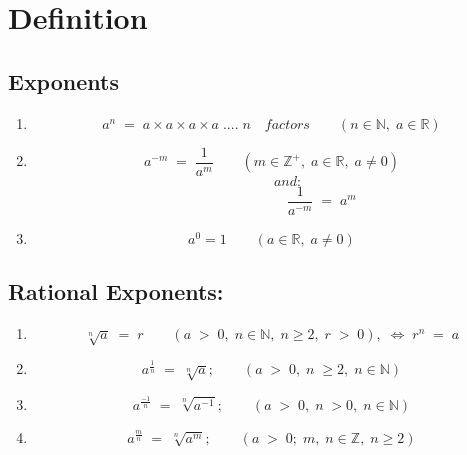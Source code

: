 \section{Definition}
\Large
\subsection{Exponents}
\begin{enumerate}%
	\item 
	\[a^n \; = \; a \times a \times a \times a \; .... \; n \quad factors \qquad (n \in \mathbb{N}, \; a \in \mathbb{R})\]
	\item 
	\[a^{-m} \; = \; \frac{1}{a^m} \qquad (m \in \mathbb{Z^+}, \; a \in \mathbb{R}, \; a \neq 0)\]
	\[\hspace{1cm} and :\]
	\[\hspace{3cm} \frac{1}{a^{-m}} \; = \; a^m\]
	\item 
	\[a^0=1 \qquad (a \in \mathbb{R}, \; a \neq 0)\]
\end{enumerate}
\subsection{Rational Exponents:}
\begin{enumerate}%
	\item
	\[\sqrt[n]{a} \; = \; r \qquad (a \; > \; 0, \; n \in \mathbb{N}, \; n \geqslant 2, \; r \; > \; 0), \; \Longleftrightarrow \; r^n \; = \; a\]
	\item
	\[a^{\frac{1}{n}} \; = \; \sqrt[n]{a}; \qquad (a \; > \; 0, \; n \; \geqslant 2, \; n \in \mathbb{N})\]
	\item
	\[a^{\frac{-1}{n}} \; = \; \sqrt[n]{a^{-1}}; \qquad (a \; > \; 0, \; n \; > 0, \; n \in \mathbb{N} )\]
	\item
	\[a^{\frac{m}{n}} \; = \; \sqrt[n]{a^m}; \qquad (a \; > \; 0; \; m, \; n \in \mathbb{Z}, \; n \geqslant 2 )\]
\end{enumerate}
